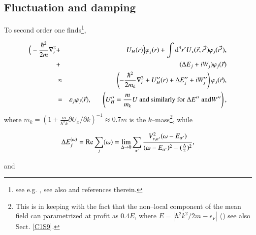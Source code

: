 \subsection{Fluctuation and damping}
 To second order one finds\footnote{see e.g. \cite{Brink:05}, see also \cite{Mahaux:85} and references therein.},

\begin{eqnarray}\label{eqn:36}
\nonumber
\Big( -\frac{\hbar^2}{2m} \nabla_r^2 &+& U_H(r)\Big) \varphi_{j}(r) + \int {\rm d}^3 r' U_x(\vec{r},\vec{r'})\varphi_j(\vec{r'}), \\
\nonumber
&+& (\Delta E_j +iW_j)\varphi_j(\vec{r}) \\
&\approx& \left( -\frac{\hbar^2}{2m_k} \nabla_r^2 + U_H''(r) + \Delta E''_j + iW''_j \right) \varphi_j(\vec{r}), \\
\nonumber
&=& \varepsilon_j\varphi_j(\vec{r}), \;\;\;\;\;\; \left( U_H'' = \frac{m}{m_k} U\text{ and similarly for }\Delta E''\text{ and} W'' \right), 
\end{eqnarray}
 where  $m_k=\left(1+\frac{m}{\hbar^2 k}\partial U_x/\partial k\right)^{-1}\approx 0.7m$ is the $k$--mass\footnote{This is in keeping with the fact that the non--local component of the mean field can parametrized at profit as 0.4$E$, where $E=|\hbar^2k^2/2m-\epsilon_F|$ (\cite{Perey:62}) see also Sect. \ref{C1S9}.}, while

\begin{equation}\label{eqn:37a}
\Delta E_j^{(\omega)} = {\rm Re} \sum_j(\omega) = \lim_{\Delta \rightarrow 0} \sum_{\alpha'} \frac{V^2_{\nu ,\alpha'} (\omega-E_{\alpha'})}{(\omega -E_{\alpha'})^2 + (\frac{\Delta}{2})^2},
\end{equation}

\noindent and

